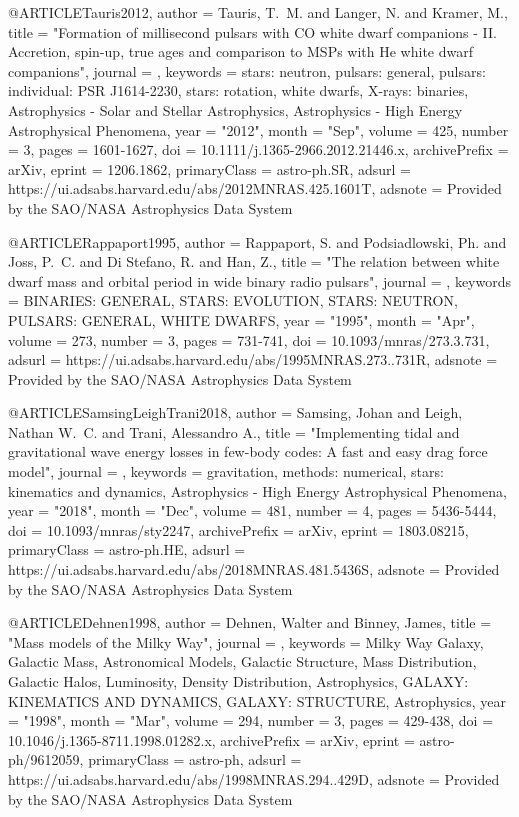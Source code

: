 \documentclass[twocolumn,tighten]{aastex63}
\begin{document}
@ARTICLE{Tauris2012,
       author = {{Tauris}, T.~M. and {Langer}, N. and {Kramer}, M.},
        title = "{Formation of millisecond pulsars with CO white dwarf companions - II. Accretion, spin-up, true ages and comparison to MSPs with He white dwarf companions}",
      journal = {\mnras},
     keywords = {stars: neutron, pulsars: general, pulsars: individual: PSR J1614-2230, stars: rotation, white dwarfs, X-rays: binaries, Astrophysics - Solar and Stellar Astrophysics, Astrophysics - High Energy Astrophysical Phenomena},
         year = "2012",
        month = "Sep",
       volume = {425},
       number = {3},
        pages = {1601-1627},
          doi = {10.1111/j.1365-2966.2012.21446.x},
archivePrefix = {arXiv},
       eprint = {1206.1862},
 primaryClass = {astro-ph.SR},
       adsurl = {https://ui.adsabs.harvard.edu/abs/2012MNRAS.425.1601T},
      adsnote = {Provided by the SAO/NASA Astrophysics Data System}
}

@ARTICLE{Rappaport1995,
       author = {{Rappaport}, S. and {Podsiadlowski}, Ph. and {Joss}, P.~C. and
         {Di Stefano}, R. and {Han}, Z.},
        title = "{The relation between white dwarf mass and orbital period in wide binary radio pulsars}",
      journal = {\mnras},
     keywords = {BINARIES: GENERAL, STARS: EVOLUTION, STARS: NEUTRON, PULSARS: GENERAL, WHITE DWARFS},
         year = "1995",
        month = "Apr",
       volume = {273},
       number = {3},
        pages = {731-741},
          doi = {10.1093/mnras/273.3.731},
       adsurl = {https://ui.adsabs.harvard.edu/abs/1995MNRAS.273..731R},
      adsnote = {Provided by the SAO/NASA Astrophysics Data System}
}

@ARTICLE{SamsingLeighTrani2018,
       author = {{Samsing}, Johan and {Leigh}, Nathan W.~C. and {Trani}, Alessandro A.},
        title = "{Implementing tidal and gravitational wave energy losses in few-body codes: A fast and easy drag force model}",
      journal = {\mnras},
     keywords = {gravitation, methods: numerical, stars: kinematics and dynamics, Astrophysics - High Energy Astrophysical Phenomena},
         year = "2018",
        month = "Dec",
       volume = {481},
       number = {4},
        pages = {5436-5444},
          doi = {10.1093/mnras/sty2247},
archivePrefix = {arXiv},
       eprint = {1803.08215},
 primaryClass = {astro-ph.HE},
       adsurl = {https://ui.adsabs.harvard.edu/abs/2018MNRAS.481.5436S},
      adsnote = {Provided by the SAO/NASA Astrophysics Data System}
}

@ARTICLE{Dehnen1998,
       author = {{Dehnen}, Walter and {Binney}, James},
        title = "{Mass models of the Milky Way}",
      journal = {\mnras},
     keywords = {Milky Way Galaxy, Galactic Mass, Astronomical Models, Galactic Structure, Mass Distribution, Galactic Halos, Luminosity, Density Distribution, Astrophysics, GALAXY: KINEMATICS AND DYNAMICS, GALAXY: STRUCTURE, Astrophysics},
         year = "1998",
        month = "Mar",
       volume = {294},
       number = {3},
        pages = {429-438},
          doi = {10.1046/j.1365-8711.1998.01282.x},
archivePrefix = {arXiv},
       eprint = {astro-ph/9612059},
 primaryClass = {astro-ph},
       adsurl = {https://ui.adsabs.harvard.edu/abs/1998MNRAS.294..429D},
      adsnote = {Provided by the SAO/NASA Astrophysics Data System}
}
\end{document}

